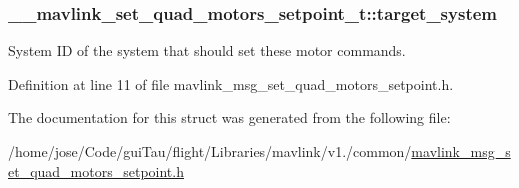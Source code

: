 \hypertarget{struct____mavlink__set__quad__motors__setpoint__t_aeb391e4974804e204d36803d9ba51001}{
\subsubsection[{target\-\_\-system}]{ \-\_\-\-\_\-mavlink\-\_\-set\-\_\-quad\-\_\-motors\-\_\-setpoint\-\_\-t\-::target\-\_\-system}}\label{struct____mavlink__set__quad__motors__setpoint__t_aeb391e4974804e204d36803d9ba51001}


System I\-D of the system that should set these motor commands. 



Definition at line 11 of file mavlink\-\_\-msg\-\_\-set\-\_\-quad\-\_\-motors\-\_\-setpoint.\-h.



The documentation for this struct was generated from the following file\-:\begin{DoxyCompactItemize}
\item 
/home/jose/\-Code/gui\-Tau/flight/\-Libraries/mavlink/v1./common/\hyperlink{mavlink__msg__set__quad__motors__setpoint_8h}{mavlink\-\_\-msg\-\_\-set\-\_\-quad\-\_\-motors\-\_\-setpoint.\-h}\end{DoxyCompactItemize}
